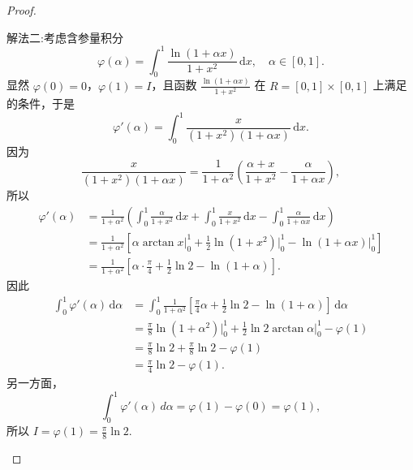 \documentclass[../../main.tex]{subfiles}%
\begin{document}
\begin{proof}
\begin{enumerate}
{\color{blue}解法二:}考虑含参量积分
\[
\varphi(\alpha) = \int_{0}^{1} \frac{\ln(1 + \alpha x)}{1 + x^2} \, \mathrm{d}x, \quad \alpha \in [0,1].
\]
显然 \( \varphi(0) = 0 \)，\( \varphi(1) = I \)，且函数 \( \frac{\ln(1 + \alpha x)}{1 + x^2} \) 在 \( R = [0,1] \times [0,1] \) 上满足 的条件，于是
\[
\varphi'(\alpha) = \int_{0}^{1} \frac{x}{(1 + x^2)(1 + \alpha x)} \, \mathrm{d}x.
\]
因为
\[
\frac{x}{(1 + x^2)(1 + \alpha x)} = \frac{1}{1 + \alpha^2} \left( \frac{\alpha + x}{1 + x^2} - \frac{\alpha}{1 + \alpha x} \right),
\]
所以
\begin{align*}
\varphi' \left( \alpha \right) &=\frac{1}{1+\alpha ^2}\left( \int_0^1{\frac{\alpha}{1+x^2}\,\mathrm{d}x}+\int_0^1{\frac{x}{1+x^2}\,\mathrm{d}x}-\int_0^1{\frac{\alpha}{1+\alpha x}\,\mathrm{d}x} \right) 
\\
&=\frac{1}{1+\alpha ^2}\left[ \alpha \arctan  x\Big|_{0}^{1}+\frac{1}{2}\ln \left( 1+x^2 \right) \Big|_{0}^{1}-\ln \left( 1+\alpha x \right) \Big|_{0}^{1} \right] 
\\
&=\frac{1}{1+\alpha ^2}\left[ \alpha \cdot \frac{\pi}{4}+\frac{1}{2}\ln 2-\ln \left( 1+\alpha \right) \right] .
\end{align*}
因此
\begin{align*}
\int_0^1{\varphi' \left( \alpha \right) \,\mathrm{d}\alpha}&=\int_0^1{\frac{1}{1+\alpha ^2}\left[ \frac{\pi}{4}\alpha +\frac{1}{2}\ln 2-\ln \left( 1+\alpha \right) \right] \,\mathrm{d}\alpha}
\\
&=\frac{\pi}{8}\ln \left( 1+\alpha ^2 \right) \Big|_{0}^{1}+\frac{1}{2}\ln 2\arctan  \alpha \Big|_{0}^{1}-\varphi \left( 1 \right) 
\\
&=\frac{\pi}{8}\ln 2+\frac{\pi}{8}\ln 2-\varphi \left( 1 \right) 
\\
&=\frac{\pi}{4}\ln 2-\varphi \left( 1 \right) .
\end{align*}
另一方面，
\[
\int_{0}^{1} \varphi'(\alpha) \, d\alpha = \varphi(1) - \varphi(0) = \varphi(1),
\]
所以 \( I = \varphi(1) = \frac{\pi}{8} \ln 2 \).
\end{enumerate}

\end{proof}
\end{document}
